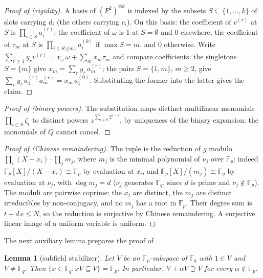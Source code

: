 \documentclass{article}
\newcommand{\Fp}{\mathbb{F}_p}
\newcommand{\Fq}{\mathbb{F}_q}
\newcommand{\extdeg}{d}
\newtheorem{lemma}[theorem]{Lemma}
\theoremstyle{definition}
\begin{document}
\begin{proof}[Proof of  (rigidity)]
A basis of $(F^2)^{\otimes k}$ is indexed by the subsets $S \subseteq \{1, \dots, k\}$ of slots carrying $d_i$ (the others carrying $c_i$). On this basis: the coefficient of $v^{(r)}$ at $S$ is $\prod_{i \in S} a^{(r)}_i$; the coefficient of $\omega$ is $1$ at $S = \emptyset$ and $0$ elsewhere; the coefficient of $\tau_m$ at $S$ is $\prod_{i \in S \setminus \{m\}} a^{(0)}_i$ if $\max S = m$, and $0$ otherwise. Write $\sum_{r \geq 1} y_r v^{(r)} = x_\omega\, \omega + \sum_m x_m \tau_m$ and compare coefficients: the singletons $S = \{m\}$ give $x_m = \sum_r y_r\, a^{(r)}_m$; the pairs $S = \{1, m\}$, $m \geq 2$, give $\sum_r y_r\, a^{(r)}_1 a^{(r)}_m = x_m\, a^{(0)}_1$. Substituting the former into the latter gives the claim.
\end{proof}

\begin{proof}[Proof of  (binary powers)]
The substitution maps distinct multilinear monomials $\prod_{i \in S} \zeta_i$ to distinct powers $z^{\sum_{i \in S} 2^{i-1}}$, by uniqueness of the binary expansion: the monomials of $Q$ cannot cancel.
\end{proof}

\begin{proof}[Proof of  (Chinese remaindering)]
The tuple is the reduction of $g$ modulo $\prod_i (X - x_i) \cdot \prod_j m_j$, where $m_j$ is the minimal polynomial of $\nu_j$ over $\Fp$: indeed $\Fp[X]/(X - x_i) \cong \Fp$ by evaluation at $x_i$, and $\Fp[X]/(m_j) \cong \Fq$ by evaluation at $\nu_j$, with $\deg m_j = \extdeg$ ($\nu_j$ generates $\Fq$, since $\extdeg$ is prime and $\nu_j \notin \Fp$). The moduli are pairwise coprime: the $x_i$ are distinct, the $m_j$ are distinct irreducibles by non-conjugacy, and no $m_j$ has a root in $\Fp$. Their degree sum is $t + \extdeg\, e \leq N$, so the reduction is surjective by Chinese remaindering. A surjective linear image of a uniform variable is uniform.
\end{proof}

The next auxiliary lemma prepares the proof of .

\begin{lemma}[subfield stabilizer]\label{lem:stabilizer}
Let $V$ be an $\Fp$-subspace of $\Fq$ with $1 \in V$ and $V \neq \Fq$. Then $\{x \in \Fq : x V \subseteq V\} = \Fp$. In particular, $V + \alpha V \supsetneq V$ for every $\alpha \notin \Fp$.
\end{lemma}
\end{document}
